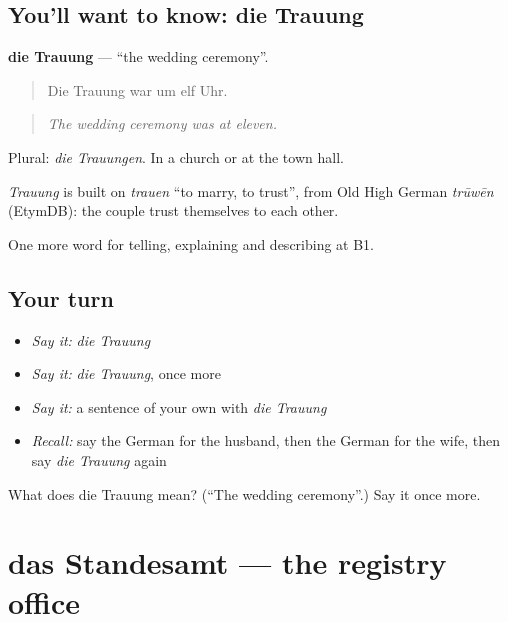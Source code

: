 \subsection*{You'll want to know: die Trauung}
\textbf{die Trauung} — \textquotedblleft{}the wedding ceremony\textquotedblright{}.

\begin{quote}
Die Trauung war um elf Uhr.
\end{quote}

\begin{quote}
\emph{The wedding ceremony was at eleven.}
\end{quote}

Plural: \emph{die Trauungen}. In a church or at the town hall.

\begin{cousinweb}
\emph{Trauung} is built on \emph{trauen} \textquotedblleft{}to marry, to trust\textquotedblright{}, from Old High German \emph{trūwēn} (EtymDB): the couple trust themselves to each other.
\end{cousinweb}

\begin{grammarlens}[title={What you've built}]
One more word for telling, explaining and describing at B1.
\end{grammarlens}

\subsection*{Your turn}
\begin{itemize}
\raggedright
  \item \emph{Say it:} \emph{die Trauung}
  \item \emph{Say it:} \emph{die Trauung}, once more
  \item \emph{Say it:} a sentence of your own with \emph{die Trauung}
  \item \emph{Recall:} say the German for the husband, then the German for the wife, then say \emph{die Trauung} again
\end{itemize}

\begin{tcolorbox}[breakable,colback=teal!4,colframe=teal!35!black,title={Before you move on}]
What does die Trauung mean? (\textquotedblleft{}The wedding ceremony\textquotedblright{}.) Say it once more.
\end{tcolorbox}
\section[das Standesamt]{das Standesamt — the registry office}

